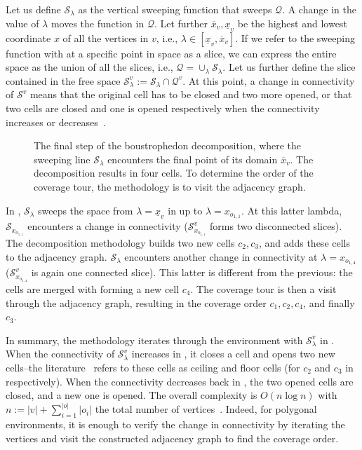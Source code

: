 Let us define $\mathcal{S}_\lambda$ as the vertical sweeping function that sweeps $\mathcal{Q}$. A change in the value of $\lambda$ moves the function in $\mathcal{Q}$. Let further $\overline{x}_v,\underline{x}_v$ be the highest and lowest coordinate $x$ of all the vertices in $v$, i.e., $\lambda\in[\underline{x}_v,\overline{x}_v]$. If we refer to the sweeping function with at a specific point in space as a slice, we can express the entire space as the union of all the slices, i.e., $\mathcal{Q}=\cup_{\lambda}\mathcal{S}_\lambda$. Let us further define the slice contained in the free space $\mathcal{S}^v_\lambda:=\mathcal{S}_\lambda\cap\mathcal{Q}^{v}$.
At this point, a change in connectivity of $\mathcal{S}^v$ means that the original cell has to be closed and two more opened, or that two cells are closed and one is opened respectively when the connectivity increases or decreases~\citep{choset2000exact}. 
\begin{figure}[h]
  \centering
  \selectfont
  
  \caption[Result of the boustrophedon decomposition]{The final step of the boustrophedon decomposition, where the sweeping line $\mathcal{S}_{\lambda}$ encounters the final point of its domain $\overline{x}_v$. The decomposition results in four cells. To determine the order of the coverage tour, the methodology is to  visit the adjacency graph.}
  \label{fig:bcd4}
\end{figure}
In , $\mathcal{S}_\lambda$ sweeps the space from $\lambda=\underline{x}_v$ in  up to $\lambda=x_{o_{1,1}}$. At this latter lambda, $\mathcal{S}_{x_{o_{1,1}}}$ encounters a change in connectivity ($\mathcal{S}^v_{x_{o_{1,1}}}$ forms two disconnected slices). The decomposition methodology builds two new cells $c_2,c_3$, and adds these cells to the adjacency graph. $\mathcal{S}_\lambda$ encounters another change in connectivity at $\lambda=x_{o_{1,4}}$ ($\mathcal{S}^v_{x_{o_{1,4}}}$ is again one connected slice). This latter is different from the previous: the cells are merged with forming a new cell $c_4$. The coverage tour is then a visit through the adjacency graph, resulting in the coverage order $c_1,c_2,c_4$, and finally $c_3$. 

In summary, the methodology iterates through the environment with $\mathcal{S}^v_{\lambda}$ in . When the connectivity of $\mathcal{S}^v_{\lambda}$ increases in , it closes a cell and opens two new cells--the literature~\citep{choset2000exact,choset2005principles} refers to these cells as ceiling and floor cells (for $c_2$ and $c_3$ in~ respectively). When the connectivity decreases back in , the two opened cells are closed, and a new one is opened. The overall complexity is $O(n\log{n})$ with $n:=|v|+\sum_{i=1}^{|o|}|o_i|$ the total number of vertices~\citep{choset2000exact}. Indeed, for polygonal environments, it is enough to verify the change in connectivity by iterating the vertices and visit the constructed adjacency graph to find the coverage order.

